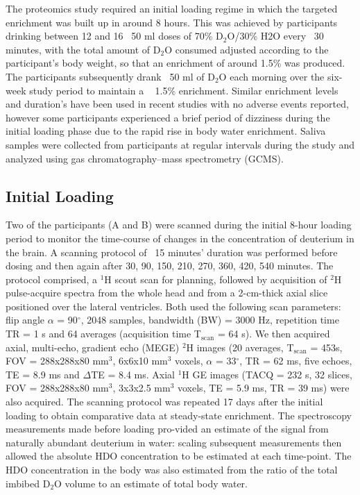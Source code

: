 \documentclass[class=article, crop=false]{standalone}
\begin{document}
The proteomics study required an initial loading regime in which the targeted enrichment was built up in around 8 hours. This was achieved by participants drinking between 12 and 16 ~50 ml doses of 70\% D$_2$O/30\% H2O every ~30 minutes, with the total amount of D$_2$O consumed adjusted according to the participant’s body weight, so that an enrichment of around 1.5\% was produced. The participants subsequently drank ~50 ml of D$_2$O each morning over the six-week study period to maintain a ~ 1.5\% enrichment. Similar enrichment levels and duration's have been used in recent studies\cite{Robinson2011Long-termSupplementation, Burger2017LeukemiaIbrutinib, Loomba2019DiscoveryLabeling} with no adverse events reported, however some participants experienced a brief period of dizziness during the initial loading phase due to the rapid rise in body water enrichment\cite{Robinson2011Long-termSupplementation}. Saliva samples were collected from participants at regular intervals during the study and analyzed using gas chromatography–mass spectrometry (GCMS)\cite{Yang1998AssaySpectrometry}.  

\subsection{Initial Loading}

Two of the participants (A and B) were scanned during the initial 8-hour loading period to monitor the time-course of changes in the concentration of deuterium in the brain. A scanning protocol of ~15 minutes’ duration was performed before dosing and then again after 30, 90, 150, 210, 270, 360, 420, 540 minutes. The protocol comprised, a $^1$H scout scan for planning, followed by acquisition of $^2$H pulse-acquire spectra from the whole head and from a 2-cm-thick axial slice positioned over the lateral ventricles. Both used the following scan parameters: flip angle $\alpha$ = 90$^\circ$, 2048 samples, bandwidth (BW) = 3000 Hz, repetition time TR = 1 s and 64 averages (acquisition time T$_\text{scan}$ = 64 s). We then acquired axial, multi-echo, gradient echo (MEGE) $^2$H images (20 averages, T$_\text{scan}$ = 453s, FOV = 288x288x80 mm$^3$, 6x6x10 mm$^3$ voxels, $\alpha$ = 33$^\circ$, TR = 62 ms, five echoes, TE = 8.9 ms and $\Delta$TE = 8.4 ms. Axial $^1$H GE images (TACQ = 232 s, 32 slices, FOV = 288x288x80 mm$^3$, 3x3x2.5 mm$^3$ voxels, TE = 5.9 ms, TR = 39 ms) were also acquired. The scanning protocol was repeated 17 days after the initial loading to obtain comparative data at steady-state enrichment. The spectroscopy measurements made before loading pro-vided an estimate of the signal from naturally abundant deuterium in water: scaling subsequent measurements then allowed the absolute HDO concentration to be estimated at each time-point. The HDO concentration in the body was also estimated from the ratio of the total imbibed D$_2$O volume to an estimate of total body water\cite{Watson1980TotalMeasurements}.
\end{document}
